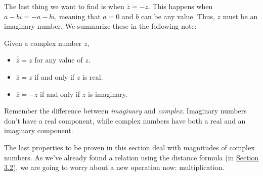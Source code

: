 \documentclass[../book.tex]{subfiles}
\begin{document}
The last thing we want to find is when $\overline{z}=-z$.  This happens when $a-bi=-a-bi$, meaning that $a=0$ and $b$ can be any value.  Thus, $z$ must be an imaginary number.  We summarize these in the following note:
\begin{note}
Given a complex number $z$, \begin{itemize}
    \item $\overline{\overline{z}}=z$ for any value of $z$.
    \item $\overline{z}=z$ if and only if $z$ is real.
    \item $\overline{z}=-z$ if and only if $z$ is imaginary.
\end{itemize}
\end{note}
\noindent Remember the difference between \textit{imaginary} and \textit{complex}.  Imaginary numbers don't have a real component, while complex numbers have both a real and an imaginary component.

The last properties to be proven in this section deal with magnitudes of complex numbers.  As we've already found a relation using the distance formula (in \hyperlink{section.3.2}{Section 3.2}), we are going to worry about a new operation now: multiplication.
\end{document}
